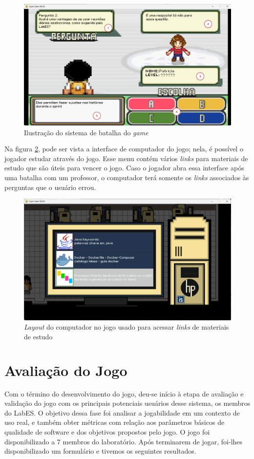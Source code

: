 \begin{figure}[h!]
    \centering
    \includegraphics[width=1\linewidth]{figuras/battle.png}
    \caption{Ilustração do sistema de batalha do \textit{game}}
    \label{fig:battle}
\end{figure}
\clearpage
Na figura \ref{fig:computer}, pode ser vista a interface de computador do jogo; nela, é possível o jogador estudar através do jogo. Esse menu contém vários \textit{links} para materiais de estudo que são úteis para vencer o jogo. Caso o jogador abra essa interface após uma batalha com um professor, o computador terá somente os \textit{links} associados às perguntas que o usuário errou.
\begin{figure}
    \centering
    \includegraphics[width=1\linewidth]{figuras/computer.png}
    \caption{\textit{Layout} do computador no jogo usado para acessar \textit{links} de materiais de estudo}
    \label{fig:computer}
\end{figure}

\clearpage
\section{Avaliação do Jogo}
\label{sec:avaliacao-do-jogo}
Com o término do desenvolvimento do jogo, deu-se início à etapa de avaliação e validação do jogo com os principais potenciais usuários desse sistema, os membros do LabES. O objetivo dessa fase foi analisar a jogabilidade em um contexto de uso real, e também obter métricas com relação aos parâmetros básicos de qualidade de software e dos objetivos propostos pelo jogo. O jogo foi disponibilizado a 7 membros do laboratório. Após terminarem de jogar, foi-lhes disponibilizado um formulário e tivemos os seguintes resultados.

